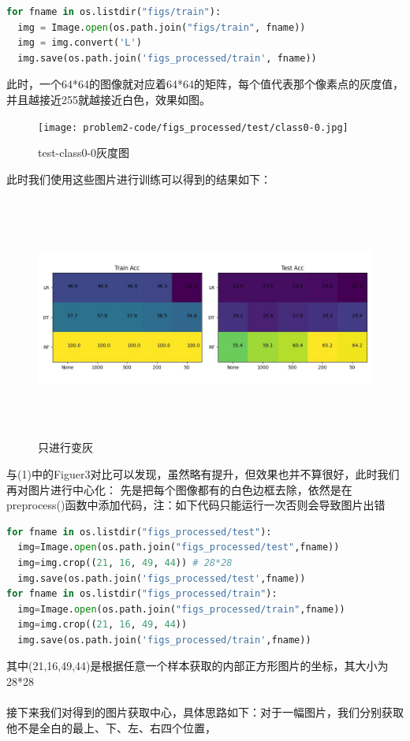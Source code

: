 \documentclass[answers]{exam}  %
\begin{document}
\begin{questions}
\begin{lstlisting}[language={Python}]
for fname in os.listdir("figs/train"):
  img = Image.open(os.path.join("figs/train", fname))
  img = img.convert('L')
  img.save(os.path.join('figs_processed/train', fname))
	\end{lstlisting}
	此时，一个64*64的图像就对应着64*64的矩阵，每个值代表那个像素点的灰度值，并且越接近255就越接近白色，效果如图。\\
	\newpage
	\begin{figure}[h]
		\centering
		\texttt{[image: problem2-code/figs\_processed/test/class0-0.jpg]}
		\caption{test-class0-0灰度图}
	\end{figure}
	此时我们使用这些图片进行训练可以得到的结果如下：
	\begin{figure}[!h]
		\centering
		\includegraphics[width=15cm,height=8cm]{problem2-code/200_grey.jpg}
		\caption{只进行变灰}
	\end{figure}
	与(1)中的Figuer3对比可以发现，虽然略有提升，但效果也并不算很好，此时我们再对图片进行中心化：
\newpage
先是把每个图像都有的白色边框去除，依然是在preprocess()函数中添加代码，注：如下代码只能运行一次否则会导致图片出错
\begin{lstlisting}[language={Python}]
for fname in os.listdir("figs_processed/test"):
  img=Image.open(os.path.join("figs_processed/test",fname))
  img=img.crop((21, 16, 49, 44)) # 28*28
  img.save(os.path.join('figs_processed/test',fname))
for fname in os.listdir("figs_processed/train"):
  img=Image.open(os.path.join("figs_processed/train",fname))
  img=img.crop((21, 16, 49, 44))
  img.save(os.path.join('figs_processed/train',fname))
\end{lstlisting}
其中(21,16,49,44)是根据任意一个样本获取的内部正方形图片的坐标，其大小为28*28\\
~\\
接下来我们对得到的图片获取中心，具体思路如下：对于一幅图片，我们分别获取他不是全白的最上、下、左、右四个位置，

\end{questions}
\end{document}
